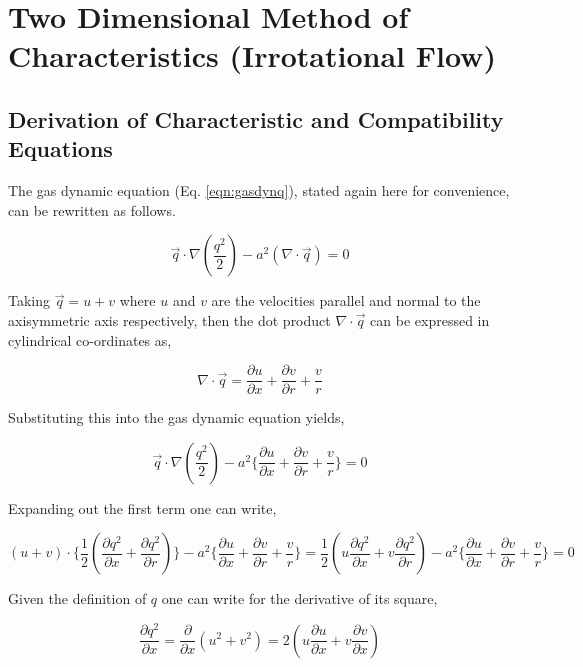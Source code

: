 \section{Two Dimensional Method of Characteristics (Irrotational Flow)}

\subsection{Derivation of Characteristic and Compatibility Equations}

	The gas dynamic equation (Eq. \ref{eqn:gasdynq}), stated again here for convenience,
can be rewritten as follows.  

\begin{displaymath}
	\vec{q}\cdot\nabla(\frac{q^2}{2}) - a^2(\nabla \cdot \vec{q}) = 0 	
\end{displaymath}

	Taking $\vec{q} = u + v$ where $u$ and $v$ are the velocities parallel and normal to the axisymmetric 
axis respectively, then the dot product $\nabla \cdot \vec{q}$ can be expressed in cylindrical co-ordinates as,

\begin{equation}
	\nabla\cdot\vec{q} = \frac{\partial u}{\partial x} + \frac{\partial v}{\partial r} 
	+ \frac{v}{r}
\label{eqn:dotprod}
\end{equation}

	Substituting this into the gas dynamic equation yields,

\begin{displaymath}
	\vec{q}\cdot\nabla(\frac{q^2}{2}) - a^2\Big\{\frac{\partial u}{\partial x} + \frac{\partial v}
	{\partial r} + \frac{v}{r}\Big\} = 0 	
\end{displaymath}

	Expanding out the first term one can write,

\begin{displaymath}
	(u+v)\cdot\Big\{\frac{1}{2}(\frac{\partial q^2}{\partial x} + \frac{\partial q^2}{\partial r})\Big\}
	- a^2\Big\{\frac{\partial u}{\partial x} + \frac{\partial v}
	{\partial r} + \frac{v}{r}\Big\}=\frac{1}{2}(u\frac{\partial q^2}{\partial x} + v\frac{\partial q^2}
	{\partial r})- a^2\Big\{\frac{\partial u}{\partial x} + \frac{\partial v}
	{\partial r} + \frac{v}{r}\Big\} = 0 	
\end{displaymath}

	Given the definition of $q$ one can write for the derivative of its square,

\begin{displaymath}
	\frac{\partial q^2}{\partial x} = \frac{\partial}{\partial x}(u^2 + v^2) = 
	2(u\frac{\partial u}{\partial x} + v\frac{\partial v}{\partial x})
\end{displaymath}

